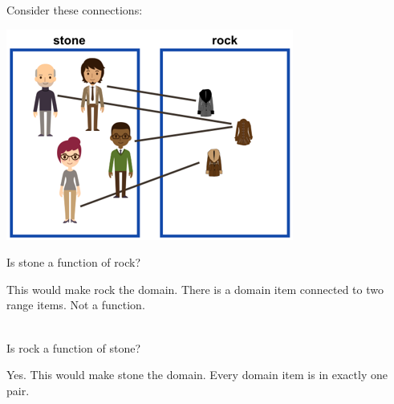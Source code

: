 \documentclass{ximera}
\begin{document}
\begin{question}
Consider these connections:
\begin{center}
\includegraphics{pics/stone_rock.png}
\end{center}


Is stone a function of rock?

\begin{multipleChoice}
\end{multipleChoice}
\begin{feedback}
This would make rock the domain.  There is a domain item connected to two range items. Not a function.
\end{feedback}
\quad \\

Is rock a function of stone?
\begin{multipleChoice}
\end{multipleChoice}
\begin{feedback}
Yes.  This would make stone the domain.  Every domain item is in exactly one pair.
\end{feedback}

\end{question}
\end{document}
